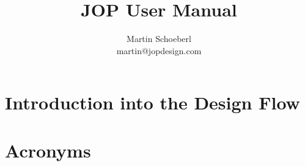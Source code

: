 





\title{JOP User Manual}
\author{Martin Schoeberl\\martin@jopdesign.com}
\maketitle \thispagestyle{empty}

%


%


\tableofcontents \cleardoublepage





%    

\chapter{Introduction into the Design Flow}
\label{chap:build}






\appendix

%    

\chapter{Acronyms}
 \label{appx:acro}



